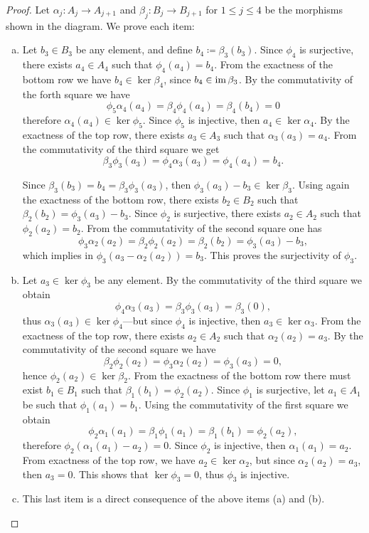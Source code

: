 \begin{proof}
Let \(\alpha_j: A_j \to A_{j+1}\) and \(\beta_j: B_j \to B_{j+1}\) for
\(1 \leq j \leq 4\) be the morphisms shown in the diagram. We prove each item:
\begin{enumerate}[(a)]\setlength\itemsep{0em}
\item Let \(b_3 \in B_3\) be any element, and define \(b_4 \coloneq
  \beta_3(b_3)\). Since \(\phi_4\) is surjective, there exists \(a_4 \in A_4\)
  such that \(\phi_4(a_4) = b_4\). From the exactness of the bottom row we have
  \(b_4 \in \ker \beta_4\), since \(b_4 \in \operatorname{im} \beta_3\). By the commutativity
  of the forth square we have
  \[
  \phi_5 \alpha_4(a_4) = \beta_4 \phi_4 (a_4) = \beta_4(b_4) = 0
  \]
  therefore \(\alpha_4(a_4) \in \ker \phi_5\). Since \(\phi_5\) is injective,
  then \(a_4 \in \ker \alpha_4\). By the exactness of the top row, there exists
  \(a_3 \in A_3\) such that \(\alpha_3(a_3) = a_4\). From the commutativity of
  the third square we get
  \[
  \beta_3 \phi_3(a_3) = \phi_4 \alpha_3(a_3) = \phi_4(a_4) = b_4.
  \]

  Since \(\beta_3(b_3) = b_4 = \beta_3 \phi_3(a_3)\), then
  \(\phi_3(a_3) - b_3 \in \ker \beta_3\). Using again the exactness of the
  bottom row, there exists \(b_2 \in B_2\) such that
  \(\beta_2(b_2) = \phi_3(a_3) - b_3\). Since \(\phi_2\) is surjective, there
  exists \(a_2 \in A_2\) such that \(\phi_2(a_2) = b_2\). From the commutativity
  of the second square one has
  \[
  \phi_3 \alpha_2(a_2) = \beta_2 \phi_2(a_2) = \beta_2(b_2) = \phi_3(a_3) - b_3,
  \]
  which implies in \(\phi_3(a_3 - \alpha_2(a_2)) = b_3\). This proves the
  surjectivity of \(\phi_3\).

\item Let \(a_3 \in \ker \phi_3\) be any element. By the commutativity of the
  third square we obtain
  \[
  \phi_4 \alpha_3 (a_3) = \beta_3 \phi_3(a_3) = \beta_3(0),
  \]
  thus \(\alpha_3(a_3) \in \ker \phi_4\)---but since \(\phi_4\) is injective,
  then \(a_3 \in \ker \alpha_3\). From the exactness of the top row, there
  exists \(a_2 \in A_2\) such that \(\alpha_2(a_2) = a_3\). By the commutativity
  of the second square we have
  \[
  \beta_2 \phi_2(a_2) = \phi_3 \alpha_2(a_2) = \phi_3(a_3) = 0,
  \]
  hence \(\phi_2(a_2) \in \ker \beta_2\). From the exactness of the bottom row
  there must exist \(b_1 \in B_1\) such that \(\beta_1(b_1) =
  \phi_2(a_2)\). Since \(\phi_1\) is surjective, let \(a_1 \in A_1\) be such
  that \(\phi_1(a_1) = b_1\). Using the commutativity of the first square we
  obtain
  \[
  \phi_2 \alpha_1(a_1) = \beta_1 \phi_1(a_1) = \beta_1(b_1) = \phi_2(a_2),
  \]
  therefore \(\phi_2(\alpha_1(a_1) - a_2) = 0\). Since \(\phi_2\) is injective,
  then \(\alpha_1(a_1) = a_2\). From exactness of the top row, we have \(a_2 \in
  \ker \alpha_2\), but since \(\alpha_2(a_2) = a_3\), then \(a_3 = 0\). This
  shows that \(\ker \phi_3 = 0\), thus \(\phi_3\) is injective.

\item This last item is a direct consequence of the above items (a) and (b).
\end{enumerate}
\end{proof}

